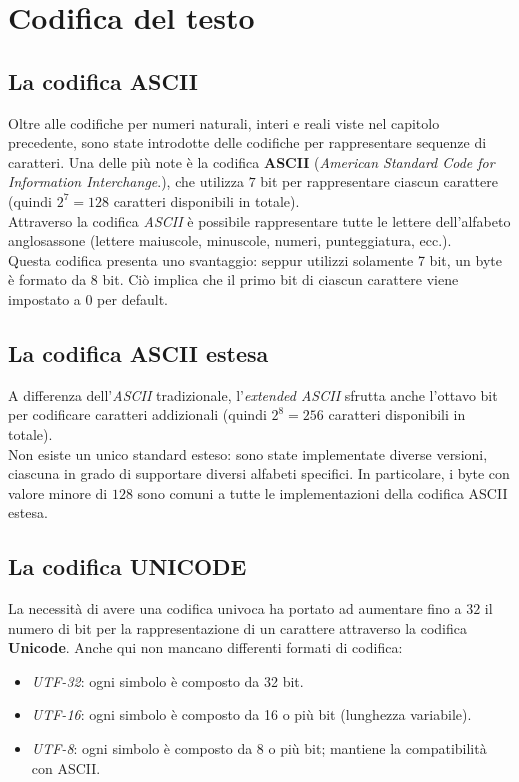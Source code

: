 \documentclass[class=book, crop=false]{standalone}
\begin{document}
\chapter{Codifica del testo}
\section{La codifica ASCII}
Oltre alle codifiche per numeri naturali, interi e reali viste nel capitolo precedente, sono state introdotte delle codifiche per rappresentare sequenze di caratteri. Una delle più note è la codifica \textbf{ASCII} (\emph{American Standard Code for Information Interchange}.), che utilizza \(7\) bit per rappresentare ciascun carattere (quindi \(2^7=128\) caratteri disponibili in totale).\\
Attraverso la codifica \emph{ASCII} è possibile rappresentare tutte le lettere dell'alfabeto anglosassone (lettere maiuscole, minuscole, numeri, punteggiatura, ecc.).\\
Questa codifica presenta uno svantaggio: seppur utilizzi solamente 7 bit, un byte è formato da 8 bit. Ciò implica che il primo bit di ciascun carattere viene impostato a 0 per default.

\section{La codifica ASCII estesa}
A differenza dell'\emph{ASCII} tradizionale, l'\emph{extended ASCII} sfrutta anche l'ottavo bit per codificare caratteri addizionali (quindi \(2^8=256\) caratteri disponibili in totale).\\
Non esiste un unico standard esteso: sono state implementate diverse versioni, ciascuna in grado di supportare diversi alfabeti specifici. In particolare, i byte con valore minore di \(128\) sono comuni a tutte le implementazioni della codifica ASCII estesa.

\section{La codifica UNICODE}
La necessità di avere una codifica univoca ha portato ad aumentare fino a \(32\) il numero di bit per la rappresentazione di un carattere attraverso la codifica \textbf{Unicode}. Anche qui non mancano differenti formati di codifica:
\begin{itemize}[noitemsep]
	\item \emph{UTF-32}: ogni simbolo è composto da 32 bit.
	\item \emph{UTF-16}: ogni simbolo è composto da 16 o più bit (lunghezza variabile).
	\item \emph{UTF-8}: ogni simbolo è composto da 8 o più bit; mantiene la compatibilità con ASCII.
\end{itemize}
\end{document}
